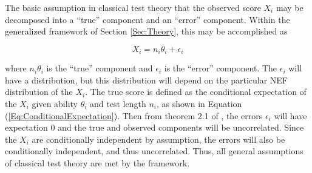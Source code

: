 \documentclass[12pt,epsfig]{article}
\newcommand{\change}[1]{\textcolor{black}{#1}}
\begin{document}
The basic assumption in classical test theory that the observed score $X_i$ may be decomposed into a ``true'' component and an ``error'' component. Within the \change{generalized} framework of Section \ref{Sec:Theory}, this may be accomplished as 




\begin{equation}
    X_i = n_i \theta_i + \epsilon_i
    \label{Eq:TrueScorePlusError}
\end{equation}

\noindent where $n_i \theta_i$ is the ``true'' component and $\epsilon_i$ is the ``error'' component. The $\epsilon_i$ will have a distribution, but this distribution will depend on the particular NEF distribution of the $X_i$. The true score is defined as the conditional expectation of the $X_i$ given ability $\theta_i$ and test length $n_i$, as shown in Equation (\ref{Eq:ConditionalExpectation}). Then from theorem 2.1 of \cite{Novick1966}, the errors $\epsilon_i$ will have expectation 0 and the true and observed components will be uncorrelated. Since the $X_i$ are conditionally independent by assumption, the errors will also be conditionally independent, and thus uncorrelated. Thus, all general assumptions of classical test theory are met by the framework. 



\end{document}
